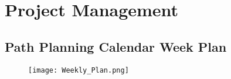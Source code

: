 \section{Project Management} \label{sec:Appendix Project Management}



\subsection{Path Planning Calendar Week Plan} \label{sec:Appendix Path Planning Calendar Week Plan}
\begin{figure}[H]
    \centering
    \texttt{[image: Weekly\_Plan.png]}
    \label{fig:Weekly Plan}
\end{figure}

